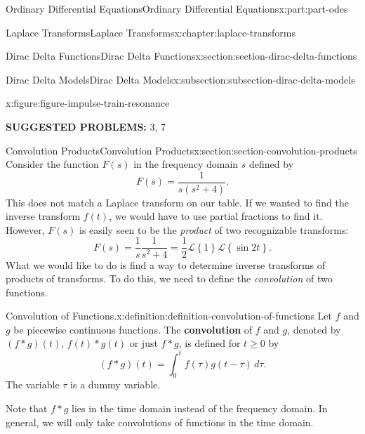 \documentclass[twoside,10pt,]{book}
\newcommand{\terminology}[1]{\textbf{#1}}
\numberwithin{equation}{part}
\newcommand{\Int}[2]{\int_{#1}^{#2}}
\newcommand{\Laplace}[1]{\mathcal{L}\left\{#1\right\}}
\begin{document}
\begin{partptx}{Ordinary Differential Equations}{}{Ordinary Differential Equations}{}{}{x:part:part-odes}
\begin{chapterptx}{Laplace Transforms}{}{Laplace Transforms}{}{}{x:chapter:laplace-transforms}
\begin{sectionptx}{Dirac Delta Functions}{}{Dirac Delta Functions}{}{}{x:section:section-dirac-delta-functions}
\begin{subsectionptx}{Dirac Delta Models}{}{Dirac Delta Models}{}{}{x:subsection:subsection-dirac-delta-models}
\begin{figureptx}{}{x:figure:figure-impulse-train-resonance}{}
\begin{image}{0}{1}{0}
{
}%
\end{image}%
\tcblower
\end{figureptx}%
\end{subsectionptx}
\terminology{SUGGESTED PROBLEMS:} 3, 7\end{sectionptx}
%
%
\typeout{************************************************}
\typeout{************************************************}
%
\begin{sectionptx}{Convolution Products}{}{Convolution Products}{}{}{x:section:section-convolution-products}
Consider the function \(F(s)\) in the frequency domain \(s\) defined by%
\begin{equation*}
F(s) = \frac{1}{s(s^{2}+4)}.
\end{equation*}
This does not match a Laplace transform on our table. If we wanted to find the inverse transform \(f(t)\), we would have to use partial fractions to find it. However, \(F(s)\) is easily seen to be the \emph{product} of two recognizable transforms:%
\begin{equation*}
F(s) = \frac{1}{s} \frac{1}{s^{2}+4} = \frac{1}{2}\Laplace{1}\Laplace{\sin2t}.
\end{equation*}
What we would like to do is find a way to determine inverse transforms of products of transforms. To do this, we need to define the \emph{convolution} of two functions.%
\begin{definition}{Convolution of Functions.}{x:definition:definition-convolution-of-functions}%
Let \(f\) and \(g\) be piecewise continuous functions. The \terminology{convolution} of \(f\) and \(g\), denoted by \((f\ast g)(t)\), \(f(t)\ast g(t)\) or just \(f\ast g\), is defined for \(t\geq0\) by%
\begin{equation*}
(f\ast g)(t) = \Int{0}{t} f(\tau)g(t-\tau)\,d\tau.
\end{equation*}
The variable \(\tau\) is a dummy variable.%
\end{definition}
Note that \(f\ast g\) lies in the time domain instead of the frequency domain. In general, we will only take convolutions of functions in the time domain.%
\par

\end{sectionptx}
\end{chapterptx}
\end{partptx}
\end{document}
